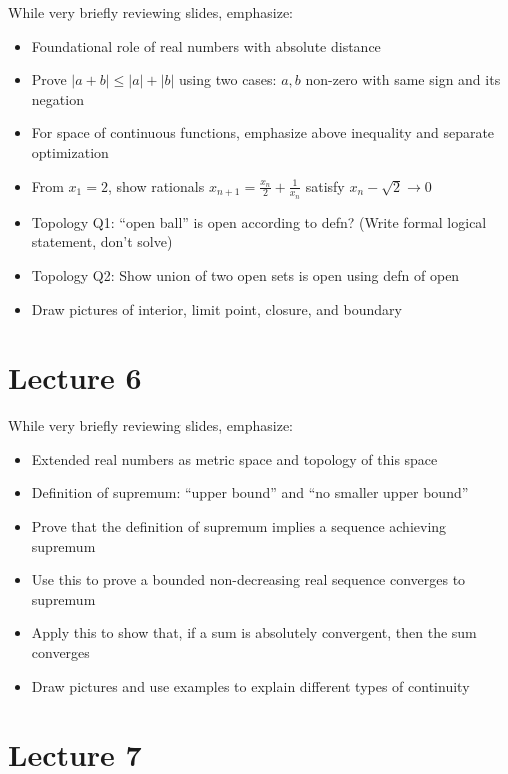 \documentclass[10pt,english]{article}
\begin{document}
While very briefly reviewing slides,  emphasize:
\begin{itemize}
  \item Foundational role of real numbers with absolute distance
  \item Prove $|a+b| \leq |a|+ |b|$ using two cases: $a,b$ non-zero with same sign and its negation
  \item For space of continuous functions, emphasize above inequality and separate optimization
  \item From $x_1 = 2$, show rationals $x_{n+1} = \frac{x_n}{2} + \frac{1}{x_n}$ satisfy $x_n - \sqrt{2} \to 0$
  \item Topology Q1: ``open ball'' is open according to defn? (Write formal  logical statement, don't solve)
  \item Topology Q2: Show union of two open sets is open using defn of open
  \item Draw pictures of interior, limit point, closure, and boundary   
\end{itemize}


\section*{Lecture 6}

While very briefly reviewing slides,  emphasize:
\begin{itemize}
  \item Extended real numbers as metric space and topology of this space
  \item Definition of supremum: ``upper bound'' and ``no smaller upper bound''
  \item Prove that the definition of supremum implies a sequence achieving supremum
  \item Use this to prove a bounded non-decreasing real sequence converges to supremum
  \item Apply this to show that, if a sum is absolutely convergent, then the sum converges
  \item Draw pictures and use examples to explain different types of continuity 
\end{itemize}


\section*{Lecture 7}
\end{document}

